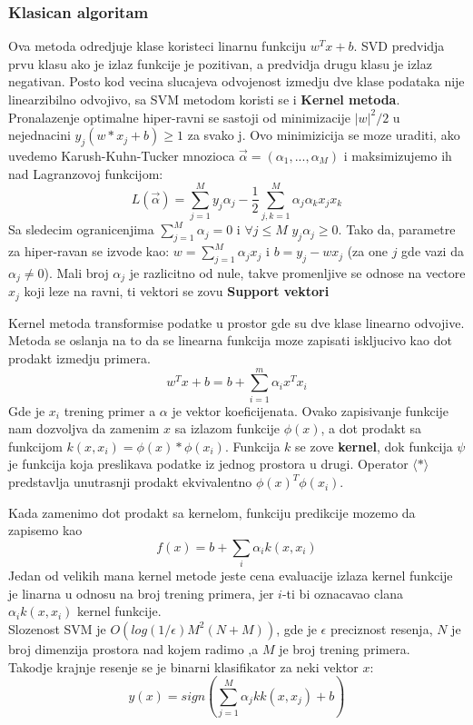 \documentclass[12pt, letterpaper, oneside]{article}
\begin{document}
\subsubsection{Klasican algoritam}
Ova metoda odredjuje klase koristeci linarnu funkciju $w^{T}x + b$. SVD predvidja prvu klasu ako je izlaz funkcije je pozitivan, a predvidja drugu klasu je izlaz negativan.
Posto kod vecina slucajeva odvojenost izmedju dve klase podataka nije linearzibilno odvojivo, sa SVM metodom koristi se i \textbf{Kernel metoda}. \\
Pronalazenje optimalne hiper-ravni se sastoji od minimizacije $|w|^{2}/2$ u nejednacini $y_j(w*x_j+b) \geq 1$ za svako j. 
Ovo minimizicija se moze uraditi, ako uvedemo Karush-Kuhn-Tucker mnozioca $\overrightarrow{\alpha} = (\alpha_1,...,\alpha_M)$ i maksimizujemo ih nad Lagranzovoj funkcijom:
\[
    L(\overrightarrow{\alpha}) = \sum_{j=1}^{M}{y_j\alpha_j} - \frac{1}{2}\sum_{j,k=1}^{M}{\alpha_j\alpha_kx_jx_k}
\]
Sa sledecim ogranicenjima $\sum_{j=1}^{M}{\alpha_j=0}$ i $\forall j \leq M $ $y_j\alpha_j \geq 0$. Tako da, parametre za hiper-ravan se izvode kao:
$w = \sum_{j=1}^{M}\alpha_jx_j$ i $b = y_j - wx_j$ (za one $j$ gde vazi da $\alpha_j \neq 0$). Mali broj $\alpha_j$ je razlicitno od nule, takve promenljive se odnose na vectore $x_j$ koji leze na ravni,
ti vektori se zovu \textbf{Support vektori} \cite{rebentrost2014quantum}

Kernel metoda transformise podatke u prostor gde su dve klase linearno odvojive. Metoda se oslanja na to da se linearna funkcija
moze zapisati iskljucivo kao dot prodakt izmedju primera.
\[
    w^{T}x + b = b + \sum_{i=1}^m \alpha_ix^Tx_i
\]
Gde je $x_i$ trening primer a $\alpha$ je vektor koeficijenata. Ovako zapisivanje funkcije nam dozvoljva da zamenim $x$ sa izlazom funkcije $\phi(x)$, a dot prodakt sa funkcijom $k(x,x_i) = \phi(x)*\phi(x_i)$.
Funkcija $k$ se zove \textbf{kernel}, dok funkcija $\psi$ je funkcija koja preslikava podatke iz jednog prostora u drugi. Operator $\langle * \rangle$ predstavlja unutrasnji prodakt ekvivalentno $\phi(x)^T\phi(x_i)$. \cite{goodfellow2016deep}

Kada zamenimo dot prodakt sa kernelom, funkciju predikcije mozemo da zapisemo kao
\[
    f(x) = b + \sum_i \alpha_{i}k(x,x_i)
\]
Jedan od velikih mana kernel metode jeste cena evaluacije izlaza kernel funkcije je linarna u odnosu na broj trening primera, jer $i$-ti bi oznacavao clana $\alpha_ik(x,x_i)$ kernel funkcije. \cite{goodfellow2016deep} \\
Slozenost SVM je $O(log(1/\epsilon)M^2(N+M))$, gde je $\epsilon$ preciznost resenja, $N$ je broj dimenzija prostora nad kojem radimo ,a $M$ je broj trening primera. \\
Takodje krajnje resenje se je binarni klasifikator za neki vektor $x$:
\[
    y(x) = sign(\sum_{j=1}^{M}\alpha_jkk(x,x_j) + b)
\]
\end{document}
